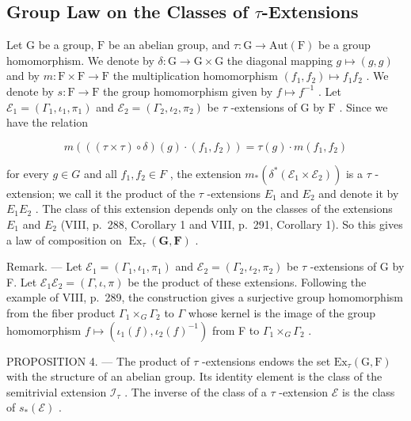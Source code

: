 \subsection{\texorpdfstring{Group Law on the Classes of \(\tau\)-Extensions}{Group Law on the Classes of \textbackslash tau-Extensions}}

Let \(\mathrm{G}\) be a group, \(\mathrm{F}\) be an abelian group, and \(\tau : \mathrm{G} \to \mathrm{Aut}(\mathrm{F})\) be a group homomorphism. We denote by \(\delta : \mathrm{G} \to \mathrm{G} \times \mathrm{G}\) the diagonal mapping \(g \mapsto (g, g)\) and by \(m : \mathrm{F} \times \mathrm{F} \to \mathrm{F}\) the multiplication homomorphism \((f_1, f_2) \mapsto f_1 f_2\) . We denote by \(s : \mathrm{F} \to \mathrm{F}\) the group homomorphism given by \(f \mapsto f^{-1}\) . Let \(\mathcal{E}_1 = (\Gamma_1, \iota_1, \pi_1)\) and \(\mathcal{E}_2 = (\Gamma_2, \iota_2, \pi_2)\) be \(\tau\) -extensions of \(\mathrm{G}\) by \(\mathrm{F}\) . Since we have the relation

\[
m (((\tau \times \tau) \circ \delta) (g) \cdot (f _ {1}, f _ {2})) = \tau (g) \cdot m (f _ {1}, f _ {2})
\]

for every \(g \in G\) and all \(f_{1}, f_{2} \in F\) , the extension \(m_{*}(\delta^{*}(\mathcal{E}_{1} \times \mathcal{E}_{2}))\) is a \(\tau\) -extension; we call it the product of the \(\tau\) -extensions \(E_{1}\) and \(E_{2}\) and denote it by \(E_{1}E_{2}\) . The class of this extension depends only on the classes of the extensions \(E_{1}\) and \(E_{2}\) (VIII, p.~288, Corollary 1 and VIII, p.~291, Corollary 1). So this gives a law of composition on \(\operatorname{Ex}_{\tau}(\mathbf{G}, \mathbf{F})\) .

Remark. --- Let \(\mathcal{E}_{1}=(\Gamma_{1},\iota_{1},\pi_{1})\) and \(\mathcal{E}_{2}=(\Gamma_{2},\iota_{2},\pi_{2})\) be \(\tau\) -extensions of G by F. Let \(\mathcal{E}_{1}\mathcal{E}_{2}=(\Gamma,\iota,\pi)\) be the product of these extensions. Following the example of VIII, p.~289, the construction gives a surjective group homomorphism from the fiber product \(\Gamma_{1}\times_{G}\Gamma_{2}\) to \(\Gamma\) whose kernel is the image of the group homomorphism \(f\mapsto(\iota_{1}(f),\iota_{2}(f)^{-1})\) from F to \(\Gamma_{1}\times_{G}\Gamma_{2}\) .

PROPOSITION 4. --- The product of \(\tau\) -extensions endows the set \(\mathrm{Ex}_{\tau}(\mathrm{G},\mathrm{F})\) with the structure of an abelian group. Its identity element is the class of the semitrivial extension \(\mathcal{I}_{\tau}\) . The inverse of the class of a \(\tau\) -extension \(\mathcal{E}\) is the class of \(s_{*}(\mathcal{E})\) .

